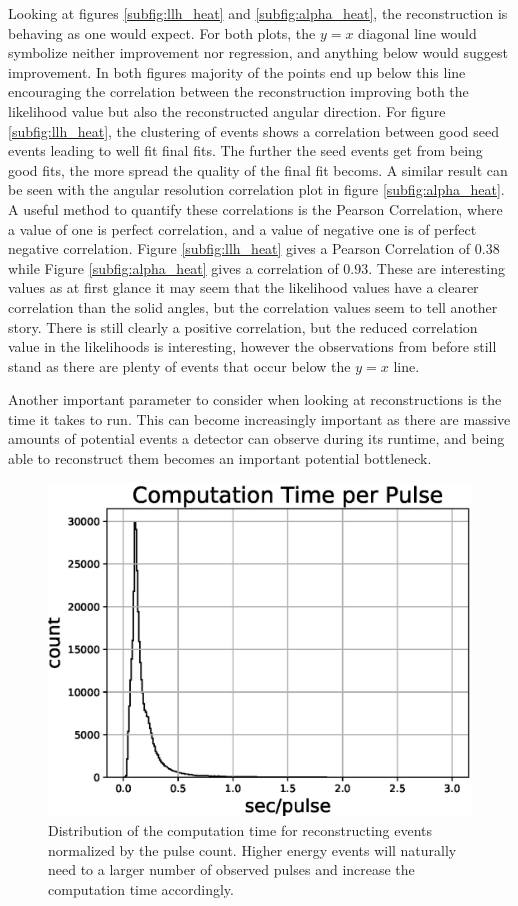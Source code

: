 Looking at figures \ref{subfig:llh_heat} and \ref{subfig:alpha_heat}, the reconstruction is behaving as one would expect. For both plots, the $y=x$ diagonal line would symbolize neither improvement nor regression, and anything below would suggest improvement. In both figures majority of the points end up below this line encouraging the correlation between the reconstruction improving both the likelihood value but also the reconstructed angular direction. For figure \ref{subfig:llh_heat}, the clustering of events shows a correlation between good seed events leading to well fit final fits. The further the seed events get from being good fits, the more spread the quality of the final fit becoms. A similar result can be seen with the angular resolution correlation plot in figure \ref{subfig:alpha_heat}. A useful method to quantify these correlations is the Pearson Correlation, where a value of one is perfect correlation, and a value of negative one is of perfect negative correlation. Figure \ref{subfig:llh_heat} gives a Pearson Correlation of 0.38 while Figure \ref{subfig:alpha_heat} gives a correlation of 0.93. These are interesting values as at first glance it may seem that the likelihood values have a clearer correlation than the solid angles, but the correlation values seem to tell another story. There is still clearly a positive correlation, but the reduced correlation value in the likelihoods is interesting, however the observations from before still stand as there are plenty of events that occur below the $y=x$ line. 

Another important parameter to consider when looking at reconstructions is the time it takes to run. This can become increasingly important as there are massive amounts of potential events a detector can observe during its runtime, and being able to reconstruct them becomes an important potential bottleneck. 

\begin{figure}[H]
  \centering
  \includegraphics[width=12cm]{./Figures/reco_plots/computation_time_perpulse.eps}
  \caption{Distribution of the computation time for reconstructing events normalized by the pulse count. Higher energy events will naturally need to a larger number of observed pulses and increase the computation time accordingly. }
  \label{fig:comp_time}
\end{figure}

